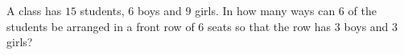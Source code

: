 A class has $15$ students, $6$ boys and $9$ girls. In how many ways can $6$ of the students be arranged in a front row of $6$ seats so that the row has $3$ boys and $3$ girls?
